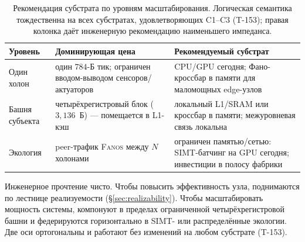 \begin{table}[H]
\centering\small
\caption{Рекомендация субстрата по уровням масштабирования. Логическая семантика
тождественна на всех субстратах, удовлетворяющих C1--C3 (T-153); правая колонка
даёт инженерную рекомендацию наименьшего импеданса.}
\label{tab:substrate-rec}
\begin{tabular}{@{}p{2.5cm}p{5.3cm}p{4.9cm}@{}}
\toprule
\textbf{Уровень} & \textbf{Доминирующая цена} & \textbf{Рекомендуемый субстрат} \\
\midrule
Один холон & один $784$-Б тик; ограничен вводом-выводом сенсоров/актуаторов & CPU/GPU сегодня; Фано-кроссбар в памяти для маломощных edge-узлов \\
Башня субъекта & четырёхрегистровый блок ($3{,}136$~Б) --- помещается в L1-кэш & локальный L1/SRAM или кроссбар в памяти; межуровневая связь локальна \\
Экология & peer-трафик \textsc{Fanos} между $N$ холонами & ограничен памятью/сетью: SIMT-батчинг на GPU сегодня; инвестиции в полосу фабрики \\
\bottomrule
\end{tabular}
\end{table}

\noindent Инженерное прочтение чисто. Чтобы повысить эффективность узла,
поднимаются по лестнице реализуемости (\S\ref{sec:realizability}). Чтобы
масштабировать мощность системы, компонуют в пределах ограниченной
четырёхрегистровой башни и федерируются горизонтально в SIMT- или распределённые
экологии. Две оси ортогональны и работают без изменений на любом субстрате (T-153).
